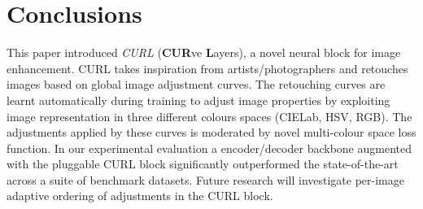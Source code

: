 \documentclass[a4paper,conference]{IEEEtran}
\begin{document}
\section{Conclusions}
This paper introduced \emph{CURL} (\textbf{CUR}ve \textbf{L}ayers), a novel neural block for image enhancement. CURL takes inspiration from artists/photographers and retouches images based on global image adjustment curves. The retouching curves are learnt automatically during training to adjust image properties by exploiting image representation in three different colours spaces (CIELab, HSV, RGB). The adjustments applied by these curves is moderated by novel multi-colour space loss function. In our experimental evaluation a encoder/decoder backbone augmented with the pluggable CURL block significantly outperformed the state-of-the-art across a suite of benchmark datasets. Future research will investigate per-image adaptive ordering of adjustments in the CURL block.































































\end{document}
